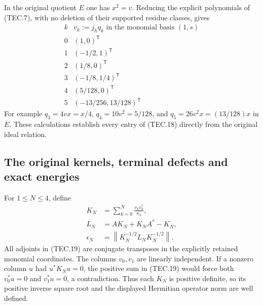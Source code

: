 In the original quotient \(E\) one has \(x^2=v\).  Reducing the
explicit polynomials of (TEC.7), with no deletion of their supported
residue classes, gives
\[
\begin{array}{c|c}
k&v_k:=j_hq_k\text{ in the monomial basis }(1,s)\\\hline
0&(1,0)^{\mathsf T}\\
1&(-1/2,1)^{\mathsf T}\\
2&(1/8,0)^{\mathsf T}\\
3&(-1/8,1/4)^{\mathsf T}\\
4&(5/128,0)^{\mathsf T}\\
5&(-13/256,13/128)^{\mathsf T}
\end{array}                                                       \tag{TEC.18}
\]
For example \(q_3=4vx=x/4\), \(q_4=10v^2=5/128\), and
\(q_5=26v^2x=(13/128)x\) in \(E\).  These calculations establish
every entry of (TEC.18) directly from the original ideal relation.

\subsection{The original kernels, terminal defects and exact energies}

For \(1\leq N\leq4\), define
\[
\begin{aligned}
 K_N&=\sum_{k=0}^N\frac{v_kv_k^*}{\kappa_k},\\
 L_N&=AK_N+K_NA^*-K_N,\\
 \epsilon_N&=\left\|K_N^{-1/2}L_NK_N^{-1/2}\right\|.
\end{aligned}                                                     \tag{TEC.19}
\]
All adjoints in (TEC.19) are conjugate transposes in the explicitly
retained monomial coordinates.  The columns \(v_0,v_1\) are linearly
independent.  If a nonzero column \(u\) had \(u^*K_Nu=0\), the
positive sum in (TEC.19) would force both \(v_0^*u=0\) and
\(v_1^*u=0\), a contradiction.  Thus each \(K_N\) is positive
definite, so its positive inverse square root and the displayed
Hermitian operator norm are well defined.

